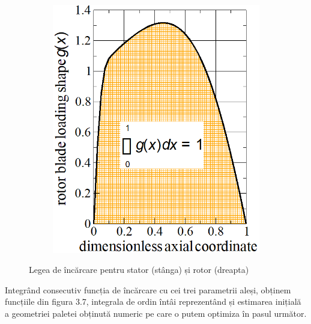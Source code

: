 \begin{figure}[h]
\begin{subfigure}{0.41\textwidth}
    \includegraphics[width=\textwidth]{figures/rotor-blade-loading-shape.png}
  \end{subfigure}
  \caption{Legea de încărcare pentru stator (stânga) și rotor (dreapta)}
\end{figure}


Integrând consecutiv funcția de încărcare cu cei trei parametrii aleși, obținem funcțiile din figura 3.7, integrala de ordin întâi reprezentând și estimarea inițială a geometriei paletei obținută numeric pe care o putem optimiza în pasul următor.

